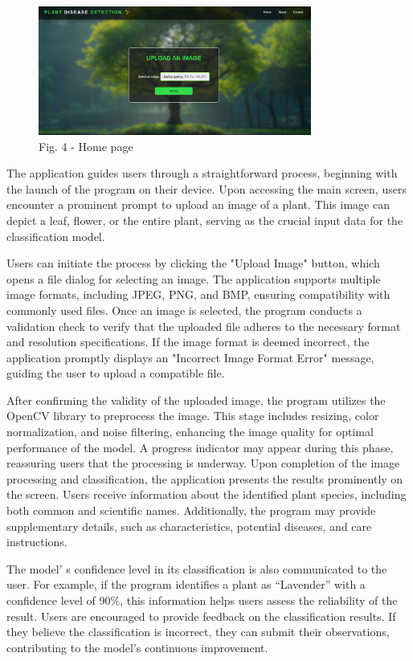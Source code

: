 \begin{figure}[H]
	\centering
	\includegraphics[width=0.8\textwidth]{media/ict/image33}
	\caption*{Fig. 4 - Home page}
\end{figure}

\begin{multicols}{2}
The application guides users through a straightforward process,
beginning with the launch of the program on their device. Upon accessing
the main screen, users encounter a prominent prompt to upload an image
of a plant. This image can depict a leaf, flower, or the entire plant,
serving as the crucial input data for the classification model.

Users can initiate the process by clicking the "Upload Image" button,
which opens a file dialog for selecting an image. The application
supports multiple image formats, including JPEG, PNG, and BMP, ensuring
compatibility with commonly used files. Once an image is selected, the
program conducts a validation check to verify that the uploaded file
adheres to the necessary format and resolution specifications. If the
image format is deemed incorrect, the application promptly displays an
"Incorrect Image Format Error" message, guiding the user to upload a
compatible file.

After confirming the validity of the uploaded image, the program
utilizes the OpenCV library to preprocess the image. This stage includes
resizing, color normalization, and noise filtering, enhancing the image
quality for optimal performance of the model. A progress indicator may
appear during this phase, reassuring users that the processing is
underway. Upon completion of the image processing and classification,
the application presents the results prominently on the screen. Users
receive information about the identified plant species, including both
common and scientific names. Additionally, the program may provide
supplementary details, such as characteristics, potential diseases, and
care instructions.

The model' s confidence level in its classification is
also communicated to the user. For example, if the program identifies a
plant as ``Lavender'' with a confidence level of 90\%, this information
helps users assess the reliability of the result. Users are encouraged
to provide feedback on the classification results. If they believe the
classification is incorrect, they can submit their observations,
contributing to the model's continuous improvement.


\end{multicols}
